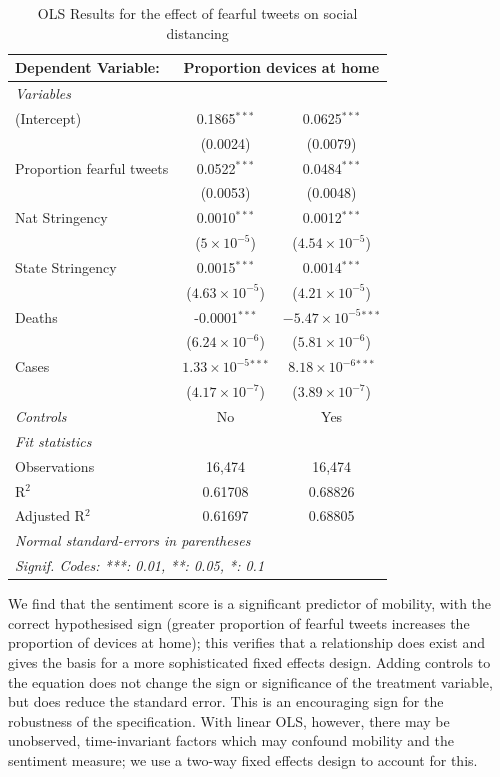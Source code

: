 \documentclass[12pt,a4]{article}
\begin{document}
\begin{table}[!htb]
  \caption{OLS Results for the effect of fearful tweets on social distancing}
\begin{tabular*}{0.9\textwidth}{l @{\extracolsep{\fill}} cc}
  \midrule\midrule
  Dependent Variable:&\multicolumn{2}{c}{Proportion devices at home}\\
  \midrule \emph{Variables}&   &  \\
  (Intercept)&0.1865$^{***}$ & 0.0625$^{***}$\\
    &(0.0024) & (0.0079)\\
  Proportion fearful tweets &0.0522$^{***}$ & 0.0484$^{***}$\\
    &(0.0053) & (0.0048)\\
  Nat Stringency&0.0010$^{***}$ & 0.0012$^{***}$\\
    &($5\times 10^{-5}$) & ($4.54\times 10^{-5}$)\\
  State Stringency&0.0015$^{***}$ & 0.0014$^{***}$\\
    &($4.63\times 10^{-5}$) & ($4.21\times 10^{-5}$)\\
  Deaths&-0.0001$^{***}$ & $-5.47\times 10^{-5}$$^{***}$\\
    &($6.24\times 10^{-6}$) & ($5.81\times 10^{-6}$)\\
  Cases&$1.33\times 10^{-5}$$^{***}$ & $8.18\times 10^{-6}$$^{***}$\\
    &($4.17\times 10^{-7}$) & ($3.89\times 10^{-7}$)\\
  \midrule \emph{Controls} & No & Yes \\
  \midrule \emph{Fit statistics}&  & \\
  Observations & 16,474&16,474\\
  R$^2$ & 0.61708&0.68826\\
  Adjusted R$^2$ & 0.61697&0.68805\\
  \midrule\midrule\multicolumn{3}{l}{\emph{Normal standard-errors in parentheses}}\\
  \multicolumn{3}{l}{\emph{Signif. Codes: ***: 0.01, **: 0.05, *: 0.1}}\\
  \end{tabular*}
\end{table}
We find that the sentiment score is a significant predictor of mobility, with the correct hypothesised sign (greater proportion of fearful tweets increases the proportion of devices at home); this verifies that a relationship does exist and gives the basis for a more sophisticated fixed effects design. Adding controls to the equation does not change the sign or significance of the treatment variable, but does reduce the standard error. This is an encouraging sign for the robustness of the specification. With linear OLS, however, there may be unobserved, time-invariant factors which may confound mobility and the sentiment measure; we use a two-way fixed effects design to account for this. 
\end{document}

